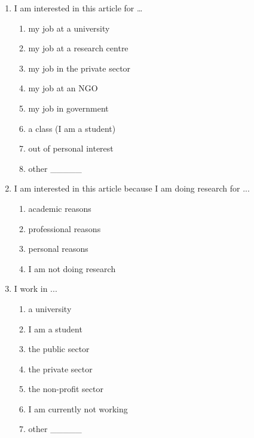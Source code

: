 \begin{enumerate}[label=Q{\arabic*}:,nosep]
    \item
        I am interested in this article for …
        \begin{enumerate}[label={\alph*}),nosep]
            \item
                my job at a university
            \item
                my job at a research centre
            \item
                my job in the private sector
            \item
                my job at an NGO
            \item
                my job in government
            \item
                a class (I am a student)
            \item
                out of personal interest
            \item
                other \_\_\_\_\_
        \end{enumerate}
    \item
        I am interested in this article because I am doing research for ...
        \begin{enumerate}[label={\alph*}),nosep]
            \item
                academic reasons
            \item
                professional reasons
            \item
                personal reasons
            \item
                I am not doing research
        \end{enumerate}
    \item
        I work in ...
        \begin{enumerate}[label={\alph*}),nosep]
            \item
                a university
            \item
                I am a student
            \item
                the public sector
            \item
                the private sector
            \item
                the non-profit sector
            \item
                I am currently not working
            \item
                other \_\_\_\_\_
        \end{enumerate}

\end{enumerate}
